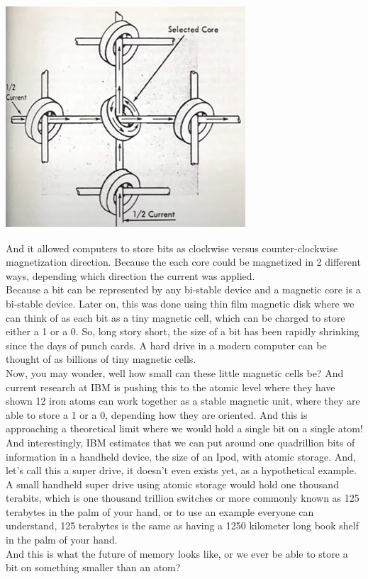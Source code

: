 \documentclass{report}
\begin{document}
\begin{center}
	\includegraphics[scale=1]{47.png}
\end{center}
And it allowed computers to store bits as clockwise versus counter-clockwise magnetization direction. Because the each core could be magnetized in 2 different ways, depending which direction the current was applied. \\
Because a bit can be represented by any bi-stable device and a magnetic core is a bi-stable device. Later on, this was done using thin film magnetic disk where we can think of as each bit as a tiny magnetic cell, which can be charged to store either a 1 or a 0. So, long story short, the size of a bit has been rapidly shrinking since the days of punch cards. A hard drive in a modern computer can be thought of as billions of tiny magnetic cells. \\
Now, you may wonder, well how small can these little magnetic cells be? And current research at IBM is pushing this to the atomic level where they have shown 12 iron atoms can work together as a stable magnetic unit, where they are able to store a 1 or a 0, depending how they are oriented. And this is approaching a theoretical limit where we would hold a single bit on a single atom!\\
And interestingly, IBM estimates that we can put around one quadrillion bits of information in a handheld device, the size of an Ipod, with atomic storage. And, let's call this a super drive, it doesn't even exists yet, as a hypothetical example. A small handheld super drive using atomic storage would hold one thousand terabits, which is one thousand trillion switches or more commonly known as 125 terabytes in the palm of your hand, or to use an example everyone can understand, 125 terabytes is the same as having a 1250 kilometer long book shelf in the palm of your hand. \\
And this is what the future of memory looks like, or we ever be able to store a bit on something smaller than an atom?
\end{document}

